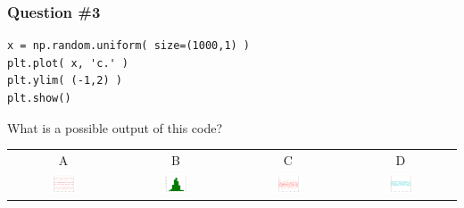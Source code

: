 \documentclass[11pt]{beamer}
\begin{document}
\begin{frame}[fragile]
  \frametitle{Question \#3}
  \Enlarge

  \begin{Verbatim}
x = np.random.uniform( size=(1000,1) )
plt.plot( x, 'c.' )
plt.ylim( (-1,2) )
plt.show()
  \end{Verbatim}

  What is a possible output of this code?

  \begin{center}
  \begin{tabular}{cccc}
    A & B & C & D \\
    \includegraphics[width=0.25\textwidth]{./img/figure_2.png}
    &
    \includegraphics[width=0.25\textwidth]{./img/figure_3.png}
    &
    \includegraphics[width=0.25\textwidth]{./img/figure_4.png}
    &
    \includegraphics[width=0.25\textwidth]{./img/figure_5.png}
  \end{tabular}
  \end{center}
\end{frame}
\end{document}
